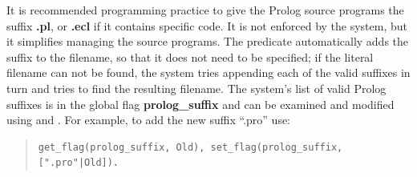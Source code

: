 It is recommended programming practice to give the Prolog source programs
the suffix {\bf .pl}, or {\bf .ecl} if it contains {\eclipse} specific code.
It is not enforced by the system, but it simplifies managing the source
programs.
The  predicate automatically adds the suffix to the
filename, so that it does not need to be specified;
if the literal filename can not be found, the system tries appending
each of the valid suffixes in turn and tries to find the resulting filename.
The system's list of valid Prolog suffixes is in the global flag
{\bf prolog_suffix} and can be examined and modified
using  and .
For example, to add the new suffix ``.pro'' use:
\begin{quote}
\begin{verbatim}
get_flag(prolog_suffix, Old), set_flag(prolog_suffix, [".pro"|Old]).
\end{verbatim}
\end{quote}

